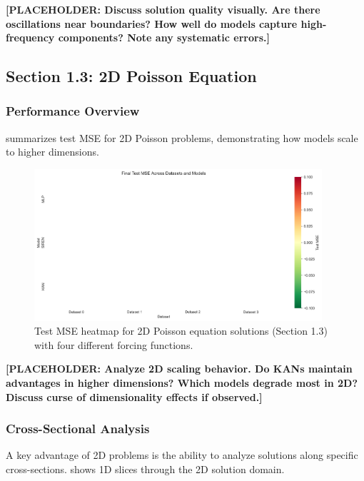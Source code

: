 \documentclass[11pt,a4paper]{article}
\begin{document}
\textbf{[PLACEHOLDER: Discuss solution quality visually. Are there oscillations near boundaries? How well do models capture high-frequency components? Note any systematic errors.]}

\subsection{Section 1.3: 2D Poisson Equation}

\subsubsection{Performance Overview}

 summarizes test MSE for 2D Poisson problems, demonstrating how models scale to higher dimensions.

\begin{figure}[htbp]
\centering
\includegraphics[width=0.95\textwidth]{../section1/analysis/section1_complete_analysis_20251021_143055/section1_3_analysis/01_comparative_metrics/all_datasets_heatmap_test.png}
\caption{Test MSE heatmap for 2D Poisson equation solutions (Section 1.3) with four different forcing functions.}
\label{fig:s13_heatmap}
\end{figure}

\textbf{[PLACEHOLDER: Analyze 2D scaling behavior. Do KANs maintain advantages in higher dimensions? Which models degrade most in 2D? Discuss curse of dimensionality effects if observed.]}

\subsubsection{Cross-Sectional Analysis}

A key advantage of 2D problems is the ability to analyze solutions along specific cross-sections.  shows 1D slices through the 2D solution domain.
\end{document}
